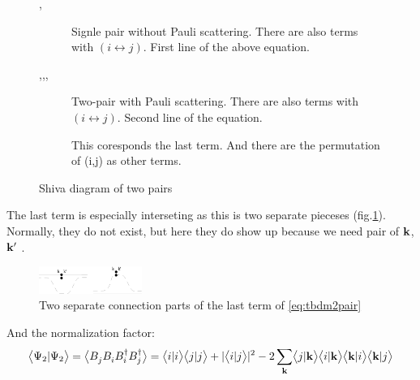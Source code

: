 \begin{figure}[htb]
\caption{Shiva diagram of two pairs }
\begin{description}
\item[,] Signle pair without Pauli scattering.  There are also terms with $(i\leftrightarrow{j})$. First line of the above equation. 
\item[,,,] Two-pair with Pauli scattering.  There are also terms with $(i\leftrightarrow{j})$. 
Second line of the equation. 
\item[] This coresponds the last term.  And there are the permutation of (i,j) as other terms.  
\end{description}
\end{figure}

The last term is especially interseting as this is two separate pieceses (fig.\ref{fig:shivaseparate}).  Normally, they do not exist, but here they do show up because we need pair of $\mathbf{k}$,$\mathbf{k}'$ .  
\begin{figure}[htb]\centering
 \includegraphics[width=0.3\textwidth]{image/shivaSeparate.eps}
\caption{Two separate connection parts of the last term of \eqref{eq:tbdm2pair}\label{fig:shivaseparate}}\centering
\end{figure}
And the normalization factor:
\begin{equation}
 {\ensuremath{\bigl<{{\Psi_2}|{\Psi_2}}\bigr>}}=\bigl<{B^{}_j{}B^{}_i{}B^{\dagger}_i{}B^{\dagger}_j}\bigr>=\bigl<{{i}|{i}}\bigr>\bigl<{{j}|{j}}\bigr>+\lvert{\ensuremath{\bigl<{{i}|{j}}\bigr>}}\rvert^2-2\sum_{\mathbf{k}}\bigl<{{j}|{\mathbf{k}}}\bigr>\bigl<{{i}|{\mathbf{k}}}\bigr>\bigl<{{\mathbf{k}}|{i}}\bigr>\bigl<{{\mathbf{k}}|{j}}\bigr>
\end{equation}

